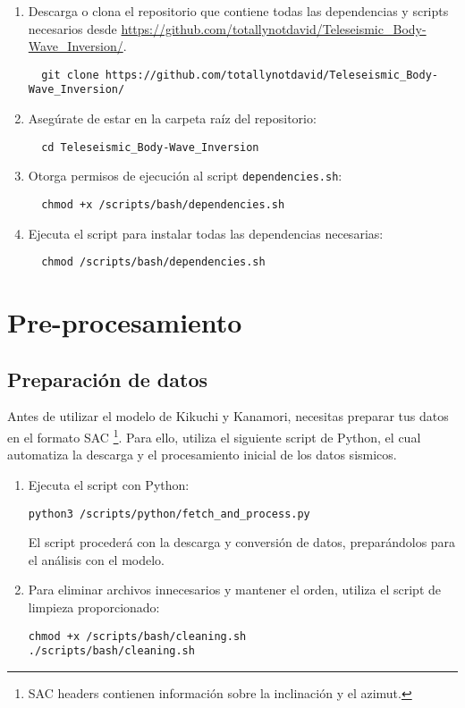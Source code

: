 \documentclass[a4paper,11pt]{refart}
\begin{document}
\begin{enumerate}
  \item Descarga o clona el repositorio que contiene todas las dependencias y scripts necesarios desde \url{https://github.com/totallynotdavid/Teleseismic_Body-Wave_Inversion/}.
  \begin{verbatim}
  git clone https://github.com/totallynotdavid/Teleseismic_Body-Wave_Inversion/
  \end{verbatim}
  \item Asegúrate de estar en la carpeta raíz del repositorio:
  \begin{verbatim}
  cd Teleseismic_Body-Wave_Inversion
  \end{verbatim}
  \item Otorga permisos de ejecución al script \texttt{dependencies.sh}:
  \begin{verbatim}
  chmod +x /scripts/bash/dependencies.sh
  \end{verbatim}
  \item Ejecuta el script para instalar todas las dependencias necesarias:
  \begin{verbatim}
  chmod /scripts/bash/dependencies.sh
  \end{verbatim}
\end{enumerate}

\section{Pre-procesamiento}

\subsection{Preparación de datos}

Antes de utilizar el modelo de Kikuchi y Kanamori, necesitas preparar tus datos en el formato SAC \footnote{SAC headers contienen información sobre la inclinación y el azimut.}. Para ello, utiliza el siguiente script de Python, el cual automatiza la descarga y el procesamiento inicial de los datos sismicos.

\begin{enumerate}
\item Ejecuta el script con Python:
\begin{verbatim}
python3 /scripts/python/fetch_and_process.py
\end{verbatim}
El script procederá con la descarga y conversión de datos, preparándolos para el análisis con el modelo.
\item Para eliminar archivos innecesarios y mantener el orden, utiliza el script de limpieza proporcionado:
\begin{verbatim}
chmod +x /scripts/bash/cleaning.sh
./scripts/bash/cleaning.sh
\end{verbatim}

\end{enumerate}
\end{document}
